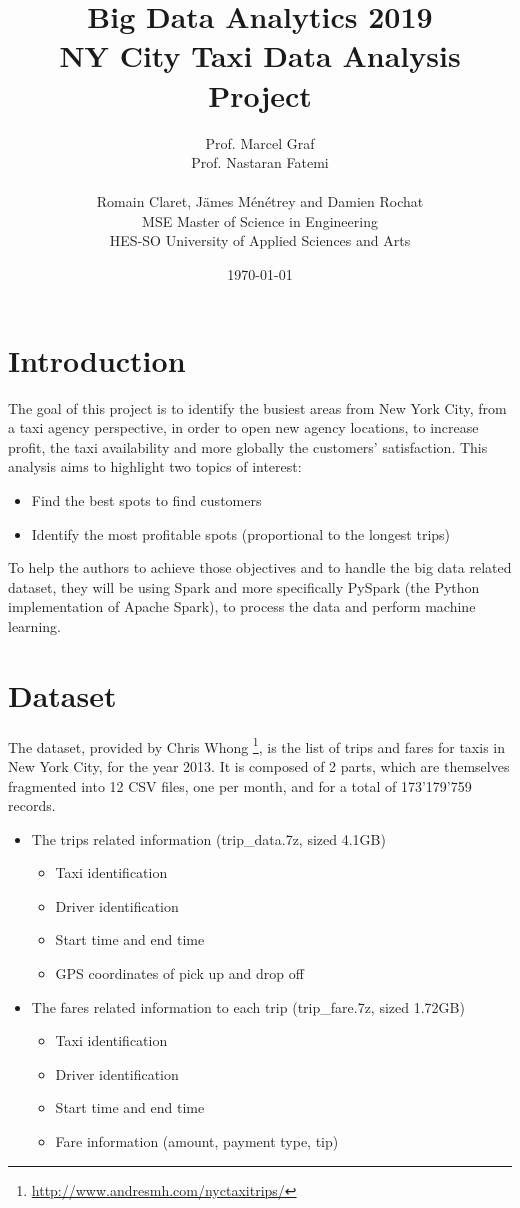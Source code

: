 \documentclass[a4paper]{article}
\title{
\Large{Big Data Analytics 2019}\\
\huge{NY City Taxi Data Analysis}\\
\large{Project}}
\author{
Prof. Marcel Graf\\
Prof. Nastaran Fatemi\\
\\
Romain Claret, Jämes Ménétrey and Damien Rochat\\
MSE Master of Science in Engineering\\
HES-SO University of Applied Sciences and Arts
\date{\today}}
\begin{document}
\maketitle

\tableofcontents
\clearpage

\section{Introduction}
The goal of this project is to identify the busiest areas from New York City, from a taxi agency perspective, in order to open new agency locations, to increase profit, the taxi availability and more globally the customers' satisfaction. This analysis aims to highlight two topics of interest:

\begin{itemize}
    \item Find the best spots to find customers
    \item Identify the most profitable spots (proportional to the longest trips)
\end{itemize}

To help the authors to achieve those objectives and to handle the big data related dataset, they will be using Spark and more specifically PySpark (the Python implementation of Apache Spark), to process the data and perform machine learning.


\section{Dataset}
The dataset, provided by Chris Whong \footnote{\url{http://www.andresmh.com/nyctaxitrips/}}, is the list of trips and fares for taxis in New York City, for the year 2013. It is composed of 2 parts, which are themselves fragmented into 12 CSV files, one per month, and for a total of 173'179'759 records.

\begin{itemize}
    \item The trips related information (trip\_data.7z, sized 4.1GB)
    \begin{itemize}
        \item Taxi identification
        \item Driver identification
        \item Start time and end time
        \item GPS coordinates of pick up and drop off
    \end{itemize}
    \item The fares related information to each trip (trip\_fare.7z, sized 1.72GB)
    \begin{itemize}
        \item Taxi identification
        \item Driver identification
        \item Start time and end time
        \item Fare information (amount, payment type, tip)
    \end{itemize}
\end{itemize}
\end{document}
